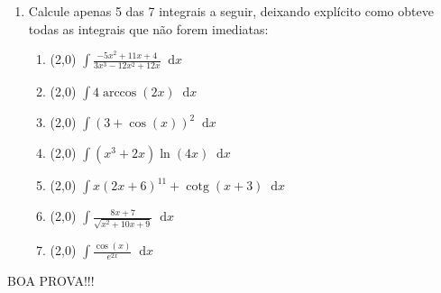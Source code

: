 \documentclass[12pt,a4paper]{article}
\newcommand*\diff{\mathop{}\!\mathrm{d}}
\newcommand*\cotg{\operatorname{cotg}}
\begin{document}
\begin{enumerate}

\item Calcule apenas 5 das 7 integrais a seguir, deixando explícito como obteve todas as integrais que não forem imediatas:
\begin{enumerate}
\item (2,0) $\displaystyle \int \frac{-5x^2 +11x +4}{3 x^3-12 x^2+12 x} \diff x$
\item (2,0) $\displaystyle \int 4\arccos(2x) \diff x$
\item (2,0) $\displaystyle \int (3+\cos(x))^2\diff x$
\item (2,0) $\displaystyle \int (x^3+2x)\ln(4x) \diff x$
\item (2,0) $\displaystyle \int x(2x+6)^{11}+\cotg(x+3) \diff x$
\item (2,0) $\displaystyle \int \frac{8x+7}{\sqrt{x^2+10x+9}} \diff x$
\item (2,0) $\displaystyle \int \frac{ \cos(x) }{ e^{2x} } \diff x$
\end{enumerate}

\end{enumerate}

\begin{center}
BOA PROVA!!!
\end{center}

\end{document}
